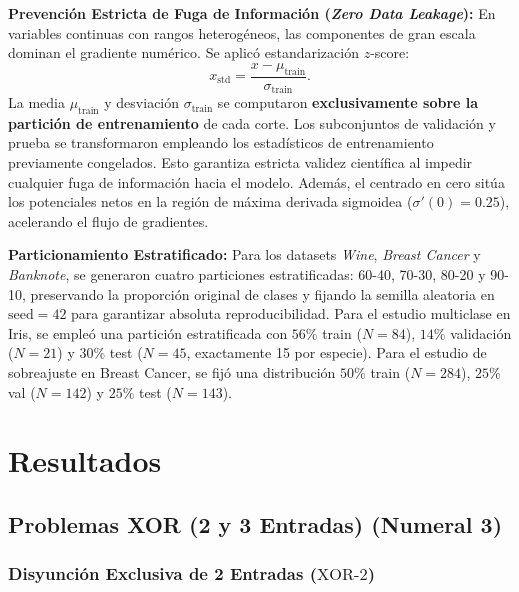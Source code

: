 \documentclass[11pt,letterpaper]{article}
\begin{document}
\textbf{Prevención Estricta de Fuga de Información (\textit{Zero Data Leakage}):} En variables continuas con rangos heterogéneos, las componentes de gran escala dominan el gradiente numérico. Se aplicó estandarización $z$-score:
\begin{equation}
    x_{\text{std}} = \frac{x - \mu_{\text{train}}}{\sigma_{\text{train}}}.
    \label{eq:zscore_scaling}
\end{equation}
La media $\mu_{\text{train}}$ y desviación $\sigma_{\text{train}}$ se computaron \textbf{exclusivamente sobre la partición de entrenamiento} de cada corte. Los subconjuntos de validación y prueba se transformaron empleando los estadísticos de entrenamiento previamente congelados. Esto garantiza estricta validez científica al impedir cualquier fuga de información hacia el modelo. Además, el centrado en cero sitúa los potenciales netos en la región de máxima derivada sigmoidea ($\sigma'(0) = 0.25$), acelerando el flujo de gradientes.

\textbf{Particionamiento Estratificado:} Para los datasets \textit{Wine}, \textit{Breast Cancer} y \textit{Banknote}, se generaron cuatro particiones estratificadas: 60-40, 70-30, 80-20 y 90-10, preservando la proporción original de clases y fijando la semilla aleatoria en $\text{seed} = 42$ para garantizar absoluta reproducibilidad. Para el estudio multiclase en Iris, se empleó una partición estratificada con $56\%$ train ($N=84$), $14\%$ validación ($N=21$) y $30\%$ test ($N=45$, exactamente 15 por especie). Para el estudio de sobreajuste en Breast Cancer, se fijó una distribución $50\%$ train ($N=284$), $25\%$ val ($N=142$) y $25\%$ test ($N=143$).

\clearpage
\section{Resultados}
\label{sec:resultados}

\subsection{Problemas XOR (2 y 3 Entradas) (Numeral 3)}

\subsubsection{Disyunción Exclusiva de 2 Entradas ($\text{XOR-2}$)}
\end{document}
